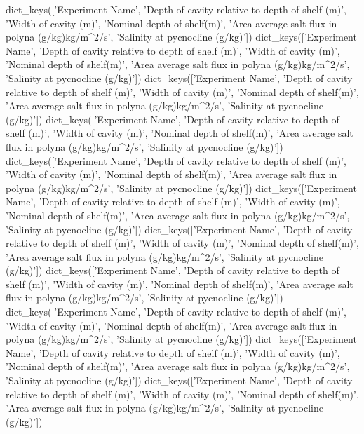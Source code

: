 dict_keys(['Experiment Name', 'Depth of cavity relative to depth of shelf (m)', 'Width of cavity (m)', 'Nominal depth of shelf(m)', 'Area average salt flux in polyna (g/kg)kg/m^2/s', 'Salinity at pycnocline (g/kg)'])
dict_keys(['Experiment Name', 'Depth of cavity relative to depth of shelf (m)', 'Width of cavity (m)', 'Nominal depth of shelf(m)', 'Area average salt flux in polyna (g/kg)kg/m^2/s', 'Salinity at pycnocline (g/kg)'])
dict_keys(['Experiment Name', 'Depth of cavity relative to depth of shelf (m)', 'Width of cavity (m)', 'Nominal depth of shelf(m)', 'Area average salt flux in polyna (g/kg)kg/m^2/s', 'Salinity at pycnocline (g/kg)'])
dict_keys(['Experiment Name', 'Depth of cavity relative to depth of shelf (m)', 'Width of cavity (m)', 'Nominal depth of shelf(m)', 'Area average salt flux in polyna (g/kg)kg/m^2/s', 'Salinity at pycnocline (g/kg)'])
dict_keys(['Experiment Name', 'Depth of cavity relative to depth of shelf (m)', 'Width of cavity (m)', 'Nominal depth of shelf(m)', 'Area average salt flux in polyna (g/kg)kg/m^2/s', 'Salinity at pycnocline (g/kg)'])
dict_keys(['Experiment Name', 'Depth of cavity relative to depth of shelf (m)', 'Width of cavity (m)', 'Nominal depth of shelf(m)', 'Area average salt flux in polyna (g/kg)kg/m^2/s', 'Salinity at pycnocline (g/kg)'])
dict_keys(['Experiment Name', 'Depth of cavity relative to depth of shelf (m)', 'Width of cavity (m)', 'Nominal depth of shelf(m)', 'Area average salt flux in polyna (g/kg)kg/m^2/s', 'Salinity at pycnocline (g/kg)'])
dict_keys(['Experiment Name', 'Depth of cavity relative to depth of shelf (m)', 'Width of cavity (m)', 'Nominal depth of shelf(m)', 'Area average salt flux in polyna (g/kg)kg/m^2/s', 'Salinity at pycnocline (g/kg)'])
dict_keys(['Experiment Name', 'Depth of cavity relative to depth of shelf (m)', 'Width of cavity (m)', 'Nominal depth of shelf(m)', 'Area average salt flux in polyna (g/kg)kg/m^2/s', 'Salinity at pycnocline (g/kg)'])
dict_keys(['Experiment Name', 'Depth of cavity relative to depth of shelf (m)', 'Width of cavity (m)', 'Nominal depth of shelf(m)', 'Area average salt flux in polyna (g/kg)kg/m^2/s', 'Salinity at pycnocline (g/kg)'])
dict_keys(['Experiment Name', 'Depth of cavity relative to depth of shelf (m)', 'Width of cavity (m)', 'Nominal depth of shelf(m)', 'Area average salt flux in polyna (g/kg)kg/m^2/s', 'Salinity at pycnocline (g/kg)'])
